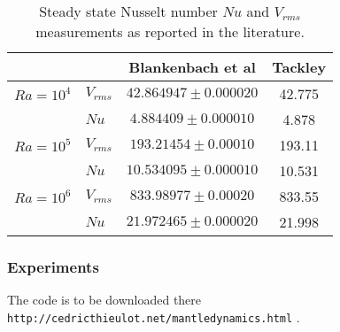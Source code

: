 \begin{table}
\centering
\begin{tabular}{llcc}
\hline
          &           & Blankenbach et al & Tackley \cite{tack94}    \\
\hline
\hline
$Ra=10^4$ & $V_{rms}$ &  $42.864947  \pm 0.000020$ & 42.775 \\
          & $Nu$      &  $4.884409   \pm 0.000010$ & 4.878  \\
$Ra=10^5$ & $V_{rms}$ &  $193.21454  \pm 0.00010 $ & 193.11 \\
          & $Nu$      &  $10.534095  \pm 0.000010$ & 10.531 \\
$Ra=10^6$ & $V_{rms}$ &  $833.98977  \pm 0.00020 $ & 833.55 \\
          & $Nu$      &  $21.972465  \pm 0.000020$ & 21.998 \\
\hline
\end{tabular} 
\caption{Steady state Nusselt number $Nu$ and $V_{rms}$ measurements as reported in the literature.  \label{tab_bl}}
\end{table}








\subsubsection{Experiments}

The code is to be downloaded there {\tt http://cedricthieulot.net/mantledynamics.html} . 


